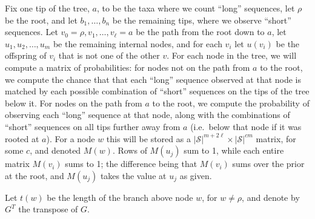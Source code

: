 \documentclass{article}
\newcommand{\calS}{\mathcal{S}}  %
\theoremstyle{plain}
\theoremstyle{definition}
\begin{document}
Fix one tip of the tree, $a$, to be the taxa where we count ``long'' sequences, let $\rho$ be the root, and let $b_1, \ldots, b_n$ be the remaining tips,
where we observe ``short'' sequences.
Let $v_0=\rho, v_1, \ldots, v_\ell = a$ be the path from the root down to $a$,
let $u_1, u_2, \ldots, u_m$ be the remaining internal nodes,
and for each $v_i$ let $u(v_i)$ be the offspring of $v_i$ that is not one of the other $v$.
For each node in the tree,
we will compute a matrix of probabilities:
for nodes not on the path from $a$ to the root,
we compute the chance that that each ``long'' sequence observed at that node
is matched by each possible combination of ``short'' sequences on the tips of the tree below it.
For nodes on the path from $a$ to the root, we compute the probability of observing
each ``long'' sequence at that node, along with the combinations of ``short'' sequences
on all tips further away from $a$ (i.e.\ below that node if it was rooted at $a$).
For a node $w$ this will be stored as a $|\calS|^{m+2\ell} \times |\calS|^{cm}$ matrix, for some $c$,
and denoted $M(w)$.
Rows of $M(u_j)$ sum to 1,
while each entire matrix $M(v_i)$ sums to 1;
the difference being that $M(v_i)$ sums over the prior at the root,
and $M(u_j)$ takes the value at $u_j$ as given.

Let $t(w)$ be the length of the branch above node $w$, for $w \neq \rho$,
and denote by $G^T$ the transpose of $G$.
\end{document}
